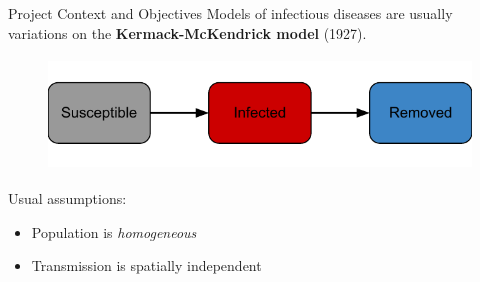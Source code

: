 \begin{slide}{Project Context and Objectives}
	Models of infectious diseases are usually variations on the \textbf{Kermack-McKendrick model} (1927).
	\begin{figure}
		\centering
		\includegraphics[height=3cm]{images/sir-idea}
	\end{figure}
	Usual assumptions:
	\begin{itemize}
		\item Population is \emph{homogeneous}
		\item Transmission is spatially independent
	\end{itemize}
\end{slide}
